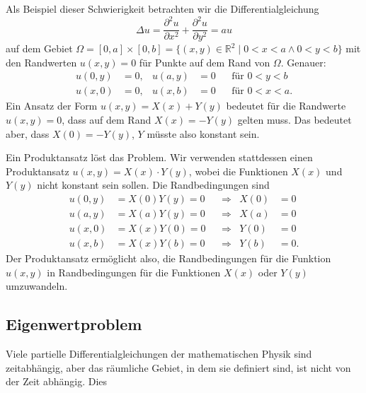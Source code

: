 Als Beispiel dieser Schwierigkeit betrachten wir die Differentialgleichung
\[
\Delta u
=
\frac{\partial^2 u}{\partial x^2}
+
\frac{\partial^2 u}{\partial y^2}
=
a u
\]
auf dem Gebiet
$\Omega = [0,a]\times [0,b] = \{(x,y)\in\mathbb{R}^2\mid 0<x<a\wedge 0<y<b\}$
mit den Randwerten $u(x,y)=0$ für Punkte auf dem Rand von $\Omega$.
Genauer:
\[
\begin{aligned}
u(0,y) &= 0,& u(a,y) &= 0&&\text{für $0<y<b$} \\
u(x,0) &= 0,& u(x,b) &= 0&&\text{für $0<x<a$}.
\end{aligned}
\]
Ein Ansatz der Form $u(x,y)=X(x) + Y(y)$ bedeutet für die
Randwerte $u(x,y)=0$, dass auf dem Rand $X(x)=-Y(y)$ gelten muss.
Das bedeutet aber, dass $X(0) = -Y(y)$, $Y$ müsste also konstant
sein.

Ein Produktansatz löst das Problem.
Wir verwenden stattdessen einen Produktansatz
$u(x,y) = X(x)\cdot Y(y)$, wobei die Funktionen $X(x)$ und $Y(y)$
nicht konstant sein sollen.
Die Randbedingungen sind
\[
\begin{aligned}
u(0,y) &= X(0) Y(y) = 0&&\Rightarrow& X(0)&=0\\
u(a,y) &= X(a) Y(y) = 0&&\Rightarrow& X(a)&=0\\
u(x,0) &= X(x) Y(0) = 0&&\Rightarrow& Y(0)&=0\\
u(x,b) &= X(x) Y(b) = 0&&\Rightarrow& Y(b)&=0.
\end{aligned}
\]
Der Produktansatz ermöglicht also, die Randbedingungen für die Funktion
$u(x,y)$ in Randbedingungen für die Funktionen $X(x)$ oder $Y(y)$
umzuwandeln.

%
%
\subsection{Eigenwertproblem
\label{buch:pde:subsection:eigenwertproblem}}
Viele partielle Differentialgleichungen der mathematischen Physik
sind zeitabhängig, aber das räumliche Gebiet, in dem sie 
definiert sind, ist nicht von der Zeit abhängig.
Dies 

